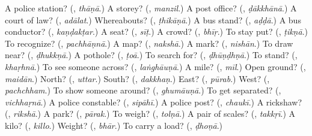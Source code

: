 \begin{tcolorbox}[breakable,colback=teal!4,colframe=teal!35!black,title={Before you move on}]
A police station? (\textbf{}, \emph{thāṇā}.) A storey? (\textbf{}, \emph{manzil}.) A post office? (\textbf{}, \emph{ḍākkhānā}.) A court of law? (\textbf{}, \emph{adālat}.) Whereabouts? (\textbf{}, \emph{ṭhikāṇā}.) A bus stand? (\textbf{}, \emph{aḍḍā}.) A bus conductor? (\textbf{}, \emph{kaṇḍakṭar}.) A seat? (\textbf{}, \emph{sīṭ}.) A crowd? (\textbf{}, \emph{bhīṛ}.) To stay put? (\textbf{}, \emph{ṭikṇā}.) To recognize? (\textbf{}, \emph{pachhāṇnā}.) A map? (\textbf{}, \emph{nakshā}.) A mark? (\textbf{}, \emph{nishān}.) To draw near? (\textbf{}, \emph{ḍhukkṇā}.) A pothole? (\textbf{}, \emph{ṭoā}.) To search for? (\textbf{}, \emph{ḍhūṇḍhṇā}.) To stand? (\textbf{}, \emph{khaṛhnā}.) To see someone across? (\textbf{}, \emph{laṅghāuṇā}.) A mile? (\textbf{}, \emph{mīl}.) Open ground? (\textbf{}, \emph{maidān}.) North? (\textbf{}, \emph{uttar}.) South? (\textbf{}, \emph{dakkhaṇ}.) East? (\textbf{}, \emph{pūrab}.) West? (\textbf{}, \emph{pachchham}.) To show someone around? (\textbf{}, \emph{ghumāuṇā}.) To get separated? (\textbf{}, \emph{vichhaṛnā}.) A police constable? (\textbf{}, \emph{sipāhī}.) A police post? (\textbf{}, \emph{chaukī}.) A rickshaw? (\textbf{}, \emph{rikshā}.) A park? (\textbf{}, \emph{pārak}.) To weigh? (\textbf{}, \emph{tolṇā}.) A pair of scales? (\textbf{}, \emph{takkṛī}.) A kilo? (\textbf{}, \emph{killo}.) Weight? (\textbf{}, \emph{bhār}.) To carry a load? (\textbf{}, \emph{ḍhoṇā}.)
\end{tcolorbox}
